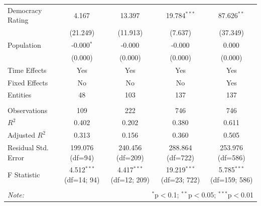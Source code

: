 \documentclass[10pt]{beamer}
\begin{document}
\begin{frame}
\begin{table}[!htbp]
{\begin{tabular}{@{\extracolsep{5pt}}lcccc}
                 Democracy Rating & 4.167$^{}$ & 13.397$^{}$ & 19.784$^{***}$ & 87.626$^{**}$ \\
                & (21.249) & (11.913) & (7.637) & (37.349) \\
                 Population & -0.000$^{*}$ & -0.000$^{}$ & -0.000$^{}$ & 0.000$^{}$ \\
                & (0.000) & (0.000) & (0.000) & (0.000) \\
                 Time Effects & Yes & Yes & Yes & Yes \\
                 Fixed Effects & No & No & No & Yes \\
                 Entities & 48 & 103 & 137 & 137 \\
                \hline \\[-1.8ex]
                 Observations & 109 & 222 & 746 & 746 \\
                 $R^2$ & 0.402 & 0.202 & 0.380 & 0.611 \\
                 Adjusted $R^2$ & 0.313 & 0.156 & 0.360 & 0.505 \\
                 Residual Std. Error & 199.076 (df=94) & 240.456 (df=209) & 288.864 (df=722) & 253.976 (df=586) \\
                 F Statistic & 4.512$^{***}$ (df=14; 94) & 4.417$^{***}$ (df=12; 209) & 19.219$^{***}$ (df=23; 722) & 5.785$^{***}$ (df=159; 586) \\
                \hline
                \hline \\[-1.8ex]
                \textit{Note:} & \multicolumn{4}{r}{$^{*}$p$<$0.1; $^{**}$p$<$0.05; $^{***}$p$<$0.01} \\
            \end{tabular}
        }
        \end{table}
    \end{frame}
\end{document}
